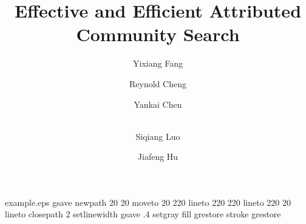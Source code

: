 \begin{filecontents*}{example.eps}
gsave
newpath
  20 20 moveto
  20 220 lineto
  220 220 lineto
  220 20 lineto
closepath
2 setlinewidth
gsave
  .4 setgray fill
grestore
stroke
grestore
\end{filecontents*}
%
\RequirePackage{fix-cm}
%
\documentclass[twocolumn]{svjour3}          %
%
\smartqed  %
%

\let\proof\relax
\let\endproof\relax

\usepackage{graphicx}
\usepackage{balance}

\usepackage{color}
\usepackage[noend]{algpseudocode}
\usepackage{algorithm}
\usepackage{varwidth}
\usepackage{url}
\usepackage{multirow}
\usepackage{subfigure}
\usepackage{mathtools}
\usepackage{amsmath,bm}
\usepackage{hyperref}
\usepackage{amsthm}
\usepackage{indentfirst}
\usepackage{times}

\renewcommand{\arraystretch}{1.18}
\newtheorem{variant}{Variant}
\newcommand{\fang}[1]{{\color{red}[\textbf{Yixiang:} #1]}}
\newcommand{\rey}[1]{{\color{blue}[\textbf{Reynold:} #1]}}
\newcommand{\luo}[1]{{\color{purple}[\textbf{Siqiang:} #1]}}
\newcommand{\hu}[1]{{\color{green}[\textbf{Jiafeng:} #1]}}
\newcommand{\chen}[1]{{\color{blue}[\textbf{Yankai:} #1]}}
\newcommand{\tabincell}[2]{\begin{tabular}{@{}#1@{}}#2\end{tabular}}





\title{Effective and Efficient Attributed Community Search}

\author{Yixiang Fang         \and
        Reynold Cheng        \and
        Yankai Chen          \and \\
        Siqiang Luo          \and
        Jiafeng Hu
}


